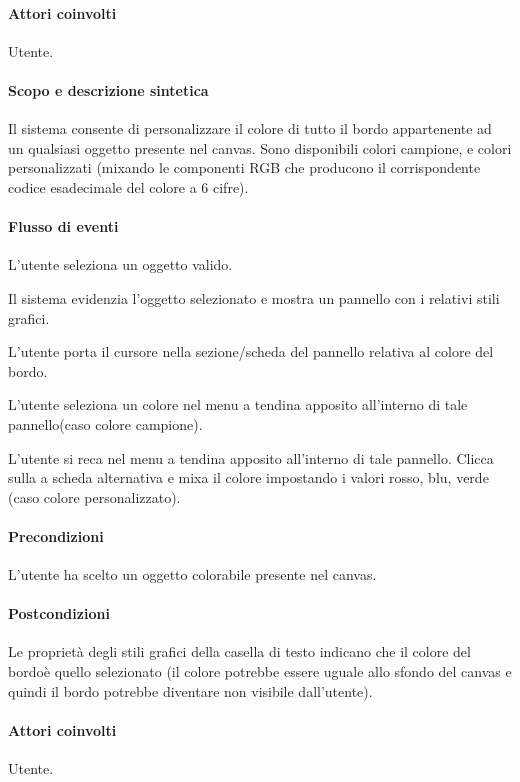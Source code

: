 \paragraph{Attori coinvolti} Utente.
\paragraph{Scopo e descrizione sintetica} Il sistema consente di personalizzare il colore di tutto il bordo appartenente ad un qualsiasi oggetto presente nel canvas. Sono disponibili colori campione, e colori personalizzati (mixando le componenti RGB che producono il corrispondente codice esadecimale del colore a 6 cifre).
\paragraph{Flusso di eventi}
\begin{elenconumerato}[\textbf{}]{\subsubsecindent}
\item L'utente seleziona un oggetto valido.
\item Il sistema evidenzia l'oggetto selezionato e mostra un pannello con i relativi stili grafici.
\item L'utente  porta  il cursore nella sezione/scheda del pannello relativa al colore del bordo.
\item L'utente seleziona un colore  nel menu a tendina apposito all'interno di tale pannello(caso colore campione).
\item L'utente si reca nel menu a tendina apposito all'interno di tale pannello. Clicca sulla a scheda alternativa e mixa il colore impostando i valori rosso, blu, verde (caso colore personalizzato).
\end{elenconumerato}
\paragraph{Precondizioni} L'utente ha scelto un oggetto colorabile presente nel canvas.
\paragraph{Postcondizioni} Le propriet\` a degli stili grafici della casella di testo indicano che il colore del bordo\` e quello selezionato (il colore potrebbe essere uguale allo sfondo del canvas e quindi il bordo potrebbe diventare non visibile dall'utente).


\paragraph{Attori coinvolti} Utente.
